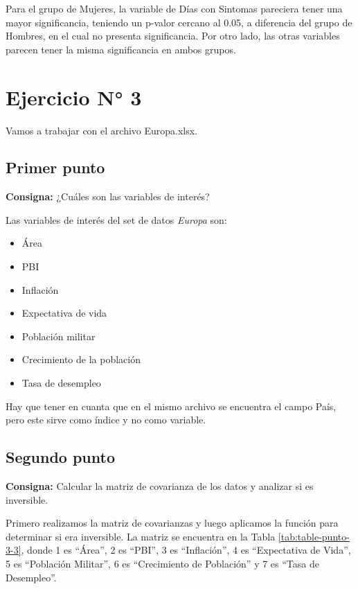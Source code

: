 \documentclass{article} %
\begin{document}
Para el grupo de Mujeres, la variable de Días con Sintomas pareciera tener una mayor significancia, teniendo un p-valor cercano al 0.05, a diferencia del grupo de Hombres, en el cual no presenta significancia. Por otro lado, las otras variables parecen tener la misma significancia en ambos grupos. 


\section{Ejercicio N° 3}

Vamos a trabajar con el archivo Europa.xlsx.

\subsection{Primer punto}

\textbf{Consigna:} ¿Cuáles son las variables de interés?

Las variables de interés del set de datos \textit{Europa} son:

\begin{itemize}
\item Área	
\item PBI	
\item Inflación	
\item Expectativa de vida	
\item Población militar	
\item Crecimiento de la población	
\item Tasa de desempleo
\end{itemize}

Hay que tener en cuanta que en el mismo archivo se encuentra el campo País, pero este sirve como índice y no como variable.

\subsection{Segundo punto}

\textbf{Consigna:} Calcular la matriz de covarianza de los datos y analizar si es inversible.

Primero realizamos la matriz de covarianzas y luego aplicamos la función para determinar si era inversible. La matriz se encuentra en la Tabla \ref{tab:table-punto-3-3}, donde 1 es ``Área'', 2 es ``PBI'', 3 es ``Inflación'', 4 es ``Expectativa de Vida'', 5 es ``Población Militar'', 6 es ``Crecimiento de Población'' y 7 es ``Tasa de Desempleo''.
\end{document}
